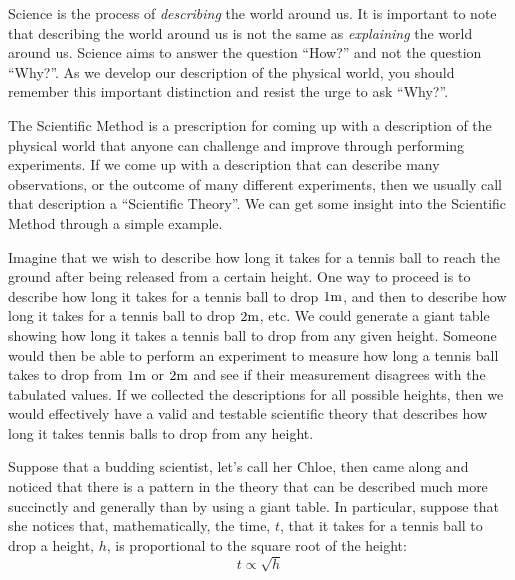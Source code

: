 Science is the process of \textit{describing} the world around us. It is important to note that describing the world around us is not the same as \textit{explaining} the world around us. Science aims to answer the question ``How?'' and not the question ``Why?''. As we develop our description of the physical world, you should remember this important distinction and resist the urge to ask ``Why?''.

The Scientific Method is a prescription for coming up with a description of the physical world that anyone can challenge and improve through performing experiments. If we come up with a description that can describe many observations, or the outcome of many different experiments, then we usually call that description a ``Scientific Theory''. We can get some insight into the Scientific Method through a simple example.

Imagine that we wish to describe how long it takes for a tennis ball to reach the ground after being released from a certain height. One way to proceed is to describe how long it takes for a tennis ball to drop $1 {\rm m}$, and then to describe how long it takes for a tennis ball to drop $2 {\rm m}$, etc. We could generate a giant table showing how long it takes a tennis ball to drop from any given height. Someone would then be able to perform an experiment to measure how long a tennis ball takes to drop from $1 {\rm m}$ or $2 {\rm m}$ and see if their measurement disagrees with the tabulated values. If we collected the descriptions for all possible heights, then we would effectively have a valid and testable scientific theory that describes how long it takes tennis balls to drop from any height.

Suppose that a budding scientist, let's call her Chloe, then came along and noticed that there is a pattern in the theory that can be described much more succinctly and generally than by using a giant table. In particular, suppose that she notices that, mathematically, the time, $t$, that it takes for a tennis ball to drop a height, $h$, is proportional to the square root of the height:
\begin{equation}
t \propto \sqrt{h}
\end{equation}

